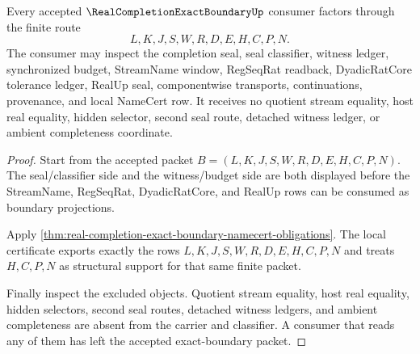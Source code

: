 \begin{theorem}
\label{thm:real-completion-exact-boundary-nonescape}
Every accepted $\RealCompletionExactBoundaryUp$ consumer factors through the finite route
$$
L,K,J,S,W,R,D,E,H,C,P,N.
$$
The consumer may inspect the completion seal, seal classifier, witness ledger, synchronized budget, StreamName window, RegSeqRat readback, DyadicRatCore tolerance ledger, RealUp seal, componentwise transports, continuations, provenance, and local NameCert row. It receives no quotient stream equality, host real equality, hidden selector, second seal route, detached witness ledger, or ambient completeness coordinate.
\end{theorem}
\begin{proof}
Start from the accepted packet $B=(L,K,J,S,W,R,D,E,H,C,P,N)$. The seal/classifier side and the witness/budget side are both displayed before the StreamName, RegSeqRat, DyadicRatCore, and RealUp rows can be consumed as boundary projections.

Apply \autoref{thm:real-completion-exact-boundary-namecert-obligations}. The local certificate exports exactly the rows $L,K,J,S,W,R,D,E,H,C,P,N$ and treats $H,C,P,N$ as structural support for that same finite packet.

Finally inspect the excluded objects. Quotient stream equality, host real equality, hidden selectors, second seal routes, detached witness ledgers, and ambient completeness are absent from the carrier and classifier. A consumer that reads any of them has left the accepted exact-boundary packet.
\end{proof}

